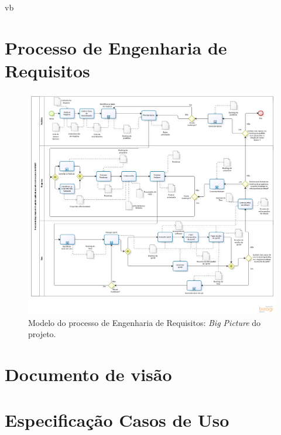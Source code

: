vb\begin{apendicesenv}
  
  \chapter{Processo de Engenharia de Requisitos}
  
    \begin{figure}[!htbp]
      \centering
      \includegraphics[scale=0.46, angle = 90]{figuras/project_big_picture}
      \caption[Modelo do processo de Engenharia de Requisitos]
	  {Modelo do processo de Engenharia de Requisitos: \textit{Big Picture} do projeto.}
      \label{project_big_picture}
    \end{figure}
  
  \chapter{Documento de visão}

    


  \chapter{Especificação Casos de Uso}
  \label{Especificacao}
  
    
    
  
  
\end{apendicesenv}
